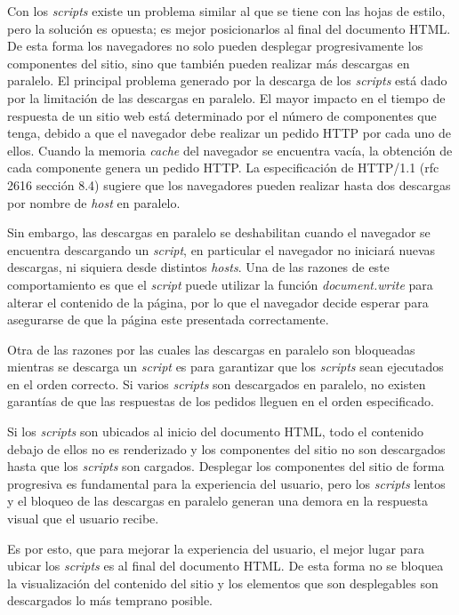 Con los \emph{scripts} existe un problema similar al que se tiene con las hojas de estilo, pero la solución es opuesta; es mejor posicionarlos al final del documento HTML.
De esta forma los navegadores no solo pueden desplegar progresivamente los componentes del sitio,
sino que también pueden realizar más descargas en paralelo.
El principal problema generado por la descarga de los \emph{scripts} está dado por la limitación de las descargas en paralelo. El mayor impacto en el tiempo de respuesta de un sitio
web está determinado por el número de componentes que tenga, debido a que el navegador debe realizar un pedido HTTP por cada uno de ellos. Cuando la memoria \emph{cache}
del navegador se encuentra vacía, la obtención de cada componente genera un pedido HTTP. La especificación de HTTP/1.1 (rfc 2616 \cite{rfc2616} sección 8.4)
sugiere que los navegadores pueden realizar hasta dos descargas por nombre de \emph{host} en paralelo.

Sin embargo, las descargas en paralelo se deshabilitan cuando el navegador se encuentra descargando un
\emph{script}, en particular el navegador no iniciará nuevas descargas, ni siquiera desde distintos
\emph{hosts}. Una de las razones de este comportamiento es que el \emph{script} puede utilizar la
función \emph{document.write} para alterar el contenido de la página, por lo que el navegador decide esperar para asegurarse de que la página este presentada correctamente.

Otra de las razones por las cuales las descargas en paralelo son bloqueadas mientras se descarga un \emph{script} es para garantizar que los \emph{scripts} sean
ejecutados en el orden correcto. Si varios \emph{scripts} son descargados en paralelo, no existen garantías de que las respuestas de los pedidos lleguen en el
orden especificado.

Si los \emph{scripts} son ubicados al inicio del documento HTML, todo el contenido debajo de ellos no es renderizado y los componentes del sitio no son descargados hasta que los
\emph{scripts} son cargados. Desplegar los componentes del sitio de forma progresiva es fundamental para la experiencia del
usuario, pero los \emph{scripts} lentos y el bloqueo de las descargas en paralelo generan una demora en la respuesta visual que el usuario recibe.

Es por esto, que para mejorar la experiencia del usuario, el mejor lugar para ubicar los \emph{scripts}
es al final del documento HTML. De esta forma no se bloquea la visualización del contenido del sitio y
los elementos que son desplegables son descargados lo más temprano posible.

